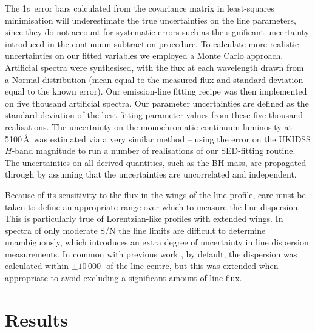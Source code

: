 The 1$\sigma$ error bars calculated from the covariance matrix in least-squares minimisation will underestimate the true uncertainties on the line parameters, since they do not account for systematic errors such as the significant uncertainty introduced in the continuum subtraction procedure.  
To calculate more realistic uncertainties on our fitted variables we employed a Monte Carlo approach. 
Artificial spectra were synthesised, with the flux at each wavelength drawn from a Normal distribution (mean equal to the measured flux and standard deviation equal to the known error). 
Our emission-line fitting recipe was then implemented on five thousand artificial spectra.  
Our parameter uncertainties are defined as the standard deviation of the best-fitting parameter values from these five thousand realisations.  
The uncertainty on the monochromatic continuum luminosity at 5100\,\AA\, was estimated via a very similar method -- using the error on the UKIDSS $H$-band magnitude to run a number of realisations of our SED-fitting routine. 
The uncertainties on all derived quantities, such as the BH mass, are propagated through by assuming that the uncertainties are uncorrelated and independent. 

Because of its sensitivity to the flux in the wings of the line profile, care must be taken to define an appropriate range over which to measure the line dispersion. 
This is particularly true of Lorentzian-like profiles with extended wings.
In spectra of only moderate S/N the line limits are difficult to determine unambiguously, which introduces an extra degree of uncertainty in line dispersion measurements.  
In common with previous work \citep[e.g.][]{vestergaard06}, by default, the dispersion was calculated within $\pm 10\,000$\,\kms\, of the line centre, but this was extended when appropriate to avoid excluding a significant amount of line flux. 

\section{Results}
\label{sec:results}

